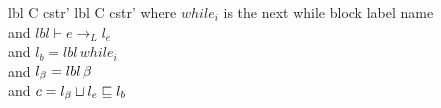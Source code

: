 \begin{trules}
        {lbl \vdash {} {C} {cstr'} }
        {lbl \vdash {} {C} {cstr'} }
        {where $while_i$ is the next while block label name\\
          and $lbl \vdash e \rightarrow_L l_e$\\
          and $l_b = lbl \, while_i$\\
          and $l_\beta = lbl \, \beta$\\
          and $c = l_\beta \sqcup l_e \sqsubseteq l_b$}
\end{trules}


